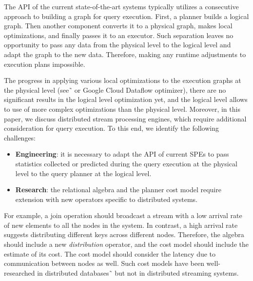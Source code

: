 The API of the current state-of-the-art systems typically utilizes a consecutive approach to building a graph for query execution. First, a planner builds a logical graph. Then another component converts it to a physical graph, makes local optimizations, and finally passes it to an executor.
Such separation leaves no opportunity to pass any data from the physical level to the logical level and adapt the graph to the new data. Therefore, making any runtime adjustments to execution plans impossible. 

The progress in applying various local optimizations to the execution graphs at the physical level (see˜\cite{grulich2020grizzly} or Google Cloud Dataflow optimizer), there are no significant results in the logical level optimization yet, and the logical level allows to use of more complex optimizations than the physical level. 
Moreover, in this paper, we discuss distributed stream processing engines, which require additional consideration for query execution. To this end, we identify the following challenges:

\begin{itemize}
    \item \textbf{Engineering}: 
    it is necessary to adapt the API of current SPEs to pass statistics collected or predicted during the query execution at the physical level to the query planner at the logical level.
    
    \item \textbf{Research}: 
    the relational algebra and the planner cost model require extension with new operators specific to distributed systems.
\end{itemize}

For example, a join operation should broadcast a stream with a low arrival rate of new elements to all the nodes in the system. 
In contrast, a high arrival rate suggests distributing different keys across different nodes. 
Therefore, the algebra should include a new \textit{distribution} operator, and the cost model should include the estimate of its cost. The cost model should consider the latency due to communication between nodes as well. Such cost models have been well-researched in distributed databases˜\cite{kossmann2000thestate} but not in distributed streaming systems.


